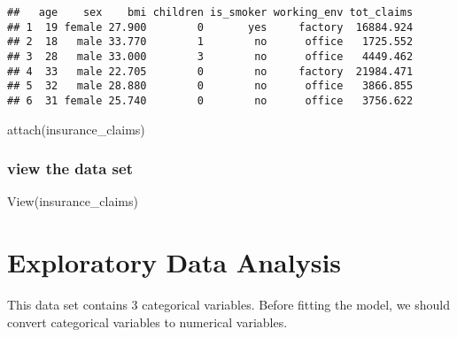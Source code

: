 \documentclass[
]{article}
\newenvironment{Shaded}{\begin{snugshade}}{\end{snugshade}}
\newcommand{\FunctionTok}[1]{\textcolor[rgb]{0.00,0.00,0.00}{#1}}
\newcommand{\NormalTok}[1]{#1}
\begin{document}
\begin{verbatim}
##   age    sex    bmi children is_smoker working_env tot_claims
## 1  19 female 27.900        0       yes     factory  16884.924
## 2  18   male 33.770        1        no      office   1725.552
## 3  28   male 33.000        3        no      office   4449.462
## 4  33   male 22.705        0        no     factory  21984.471
## 5  32   male 28.880        0        no      office   3866.855
## 6  31 female 25.740        0        no      office   3756.622
\end{verbatim}

\begin{Shaded}
\begin{Highlighting}[]
\FunctionTok{attach}\NormalTok{(insurance\_claims)}
\end{Highlighting}
\end{Shaded}

\hypertarget{view-the-data-set}{%
\subsubsection{view the data set}\label{view-the-data-set}}

\begin{Shaded}
\begin{Highlighting}[]
\FunctionTok{View}\NormalTok{(insurance\_claims)}
\end{Highlighting}
\end{Shaded}

\hypertarget{exploratory-data-analysis}{%
\section{Exploratory Data Analysis}\label{exploratory-data-analysis}}

This data set contains 3 categorical variables. Before fitting the
model, we should convert categorical variables to numerical variables.
\end{document}
